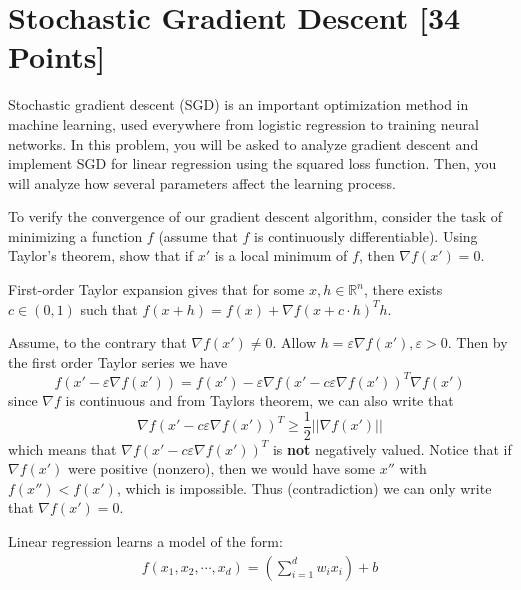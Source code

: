 
\newpage
\section{Stochastic Gradient Descent [34 Points]}

Stochastic gradient descent (SGD) is an important optimization method in machine learning, used everywhere from logistic regression to training neural networks. In this problem, you will be asked to analyze gradient descent and implement SGD for linear regression using the squared loss function. Then, you will analyze how several parameters affect the learning process.

\begin{problem}[3]
    To verify the convergence of our gradient descent algorithm, consider the task of minimizing a function $f$ (assume that $f$ is continuously differentiable). Using Taylor's theorem, show that if $x'$ is a local minimum of $f$, then $\nabla f(x') = 0$. 
\end{problem}
\begin{hint}
  First-order Taylor expansion gives that for some $x, h \in \mathbb{R}^n$, there exists $c \in (0, 1)$ such that $f(x + h) = f(x) + \nabla f(x + c\cdot h)^T h$.
  
\end{hint}
\begin{solution}
Assume, to the contrary that $\nabla f(x') \neq 0$. Allow $h = \varepsilon \nabla f(x'), \varepsilon > 0$. Then by the first order Taylor series we have
$$
f(x' - \varepsilon \nabla f(x')) = f(x') - \varepsilon \nabla f(x' - c \varepsilon \nabla f(x'))^T\nabla f(x')
$$
since $\nabla f$ is continuous and from Taylors theorem, we can also write that
$$
\nabla f(x' - c \varepsilon \nabla f(x'))^T \geq \frac{1}{2} || \nabla f(x') ||
$$
which means that $\nabla f(x' - c \varepsilon \nabla f(x'))^T$ is \textbf{not} negatively valued. Notice that if $\nabla f(x')$ were positive (nonzero), then we would have some $x''$ with$f(x'') < f(x')$, which is impossible. Thus (contradiction) we can only write that $\nabla f(x') = 0$.
\end{solution}
\newpage
Linear regression learns a model of the form:
\begin{align*}
  f(x_1, x_2, \cdots, x_d) = \left(\sum_{i=1}^d w_i x_i\right) + b
\end{align*}

